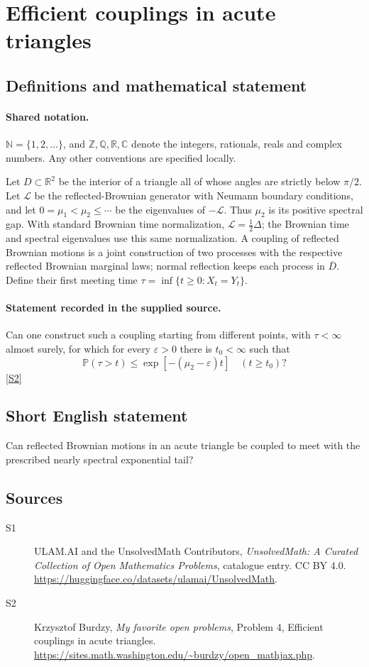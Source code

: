 \documentclass[11pt]{article}
\newcommand{\sref}[2]{\hyperlink{source:#1:#2}{[S#2]}}
\begin{document}
\section{Efficient couplings in acute triangles}\label{statement}

\subsection{Definitions and mathematical statement}

\paragraph{Shared notation.}$\mathbb N=\{1,2,\ldots\}$, and $\mathbb Z,\mathbb Q,\mathbb R,\mathbb C$ denote the integers, rationals, reals and complex numbers. Any other conventions are specified locally.


Let $D\subset\mathbb R^2$ be the interior of a triangle all of whose angles are strictly below $\pi/2$. Let $\mathcal L$ be the reflected-Brownian generator with Neumann boundary conditions, and let $0=\mu_1<\mu_2\le\cdots$ be the eigenvalues of $-\mathcal L$. Thus $\mu_2$ is its positive spectral gap. With standard Brownian time normalization, $\mathcal L=\tfrac12\Delta$; the Brownian time and spectral eigenvalues use this same normalization. A coupling of reflected Brownian motions is a joint construction of two processes with the respective reflected Brownian marginal laws; normal reflection keeps each process in $\overline D$. Define their first meeting time $\tau=\inf\{t\ge0:X_t=Y_t\}$.
\paragraph{Statement recorded in the supplied source.}
Can one construct such a coupling starting from different points, with $\tau<\infty$ almost surely, for which for every $\varepsilon>0$ there is $t_0<\infty$ such that
\[\mathbb P(\tau>t)\le\exp[-(\mu_2-\varepsilon)t]\quad(t\ge t_0)?\] \sref{statement}{2}
\subsection{Short English statement}
Can reflected Brownian motions in an acute triangle be coupled to meet with the prescribed nearly spectral exponential tail?
\subsection{Sources}
\begin{description}
\item[\hypertarget{source:statement:1}{S1}] ULAM.AI and the UnsolvedMath Contributors, \emph{UnsolvedMath: A Curated Collection of Open Mathematics Problems}, catalogue entry. CC BY 4.0. \url{https://huggingface.co/datasets/ulamai/UnsolvedMath}.
\item[\hypertarget{source:statement:2}{S2}] Krzysztof Burdzy, \emph{My favorite open problems}, Problem 4, Efficient couplings in acute triangles. \url{https://sites.math.washington.edu/~burdzy/open_mathjax.php}.
\end{description}
\label{end:statement}
\end{document}
